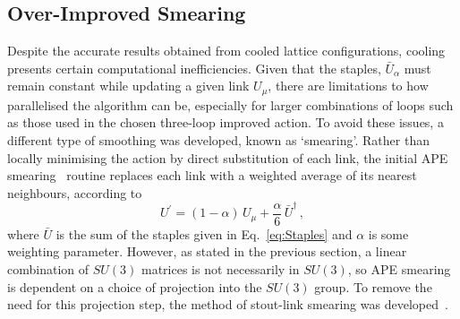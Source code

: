 \subsection{Over-Improved Smearing}
Despite the accurate results obtained from cooled lattice configurations, cooling presents certain computational inefficiencies. Given that the staples, $\bar{U}_\alpha$ must remain constant while updating a given link $U_\mu$, there are limitations to how  parallelised the algorithm can be, especially for larger combinations of loops such as those used in the chosen three-loop improved action. To avoid these issues, a different type of smoothing was developed, known as `smearing'. Rather than locally minimising the action by direct substitution of each link, the initial APE smearing~\cite{Albanese:1987ds, Falcioni:1984ei} routine replaces each link with a weighted average of its nearest neighbours, according to
%
\begin{equation}
U^\prime = (1-\alpha)\,U_\mu + \frac{\alpha}{6}\,\bar{U}^\dagger\, ,
\end{equation}
%
where $\bar{U}$ is the sum of the staples given in Eq.~\eqref{eq:Staples} and $\alpha$ is some weighting parameter. However, as stated in the previous section, a linear combination of $SU(3)$ matrices is not necessarily in $SU(3)$, so APE smearing is dependent on a choice of projection into the $SU(3)$ group. To remove the need for this projection step, the method of stout-link smearing was developed~\cite{Morningstar:2003gk}.\\

